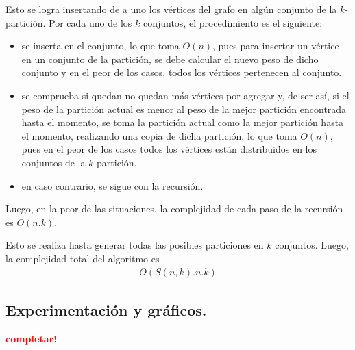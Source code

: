 Esto se logra insertando de a uno los vértices del grafo en algún conjunto de
la $k$-partición. Por cada uno de los $k$ conjuntos, el procedimiento es el
siguiente:
\begin{itemize}
  \item se inserta en el conjunto, lo que toma $O(n)$, pues para insertar un
  vértice en un conjunto de la partición, se debe calcular el nuevo peso de
  dicho conjunto y en el peor de los casos, todos los vértices pertenecen al
  conjunto.
  \item se comprueba si quedan no quedan más vértices por agregar y, de ser
  así, si el peso de la partición actual es menor al peso de la mejor partición
  encontrada hasta el momento, se toma la partición actual como la mejor
  partición hasta el momento, realizando una copia de dicha partición, lo que
  toma $O(n)$, pues en el peor de los casos todos los vértices están
  distribuidos en los conjuntos de la $k$-partición.
  \item en caso contrario, se sigue con la recursión.
\end{itemize}

Luego, en la peor de las situaciones, la complejidad de cada paso de la
recursión es $O(n . k)$.

Esto se realiza hasta generar todas las posibles particiones en $k$ conjuntos.
Luego, la complejidad total del algoritmo es
\begin{align*}
  O(S(n, k) . n . k)
\end{align*}


\newpage \subsection{Experimentación y gráficos.}
\vspace*{0.3cm}

\textcolor{red}{\textbf{completar!}}
